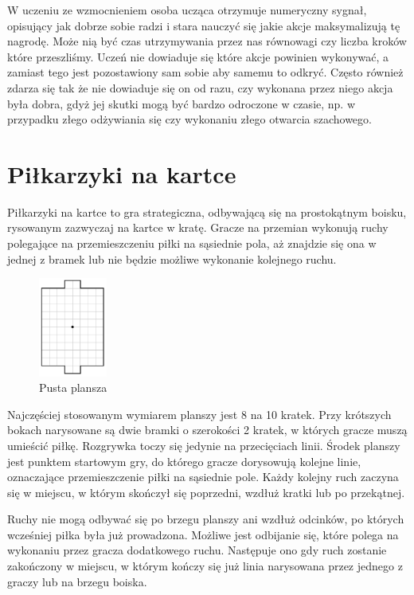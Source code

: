 \documentclass[licencjacka]{pracamgr}
\begin{document}
W uczeniu ze wzmocnieniem osoba ucząca otrzymuje numeryczny sygnał, opisujący jak dobrze sobie radzi i stara nauczyć się jakie akcje maksymalizują tę nagrodę. Może nią być czas utrzymywania przez nas równowagi czy liczba kroków które przeszliśmy. Uczeń nie dowiaduje się które akcje powinien wykonywać, a zamiast tego jest pozostawiony sam sobie aby samemu to odkryć. Często również zdarza się tak że nie dowiaduje się on od razu, czy wykonana przez niego akcja była dobra, gdyż jej skutki mogą być bardzo odroczone w czasie, np. w przypadku złego odżywiania się czy wykonaniu złego otwarcia szachowego.

\section{Piłkarzyki na kartce}

Piłkarzyki na kartce to gra strategiczna, odbywającą się na prostokątnym boisku, rysowanym zazwyczaj na kartce w kratę.
Gracze na przemian wykonują ruchy polegające na przemieszczeniu piłki na sąsiednie pola, aż znajdzie się ona w jednej z bramek lub nie będzie możliwe wykonanie kolejnego ruchu.

\begin{figure}[ht]
  \centering
  \includegraphics[width=0.2\textwidth]{board}
  \caption{Pusta plansza}
\end{figure}

Najczęściej stosowanym wymiarem planszy jest 8 na 10 kratek.
Przy krótszych bokach narysowane są dwie bramki o szerokości 2 kratek, w których gracze muszą umieścić piłkę.
Rozgrywka toczy się jedynie na przecięciach linii.
Środek planszy jest punktem startowym gry, do którego gracze dorysowują kolejne linie, oznaczające przemieszczenie piłki na sąsiednie pole. Każdy kolejny ruch zaczyna się w miejscu, w którym skończył się poprzedni, wzdłuż kratki lub po przekątnej. 

Ruchy nie mogą odbywać się po brzegu planszy ani wzdłuż odcinków, po których wcześniej piłka była już prowadzona.
Możliwe jest odbijanie się, które polega na wykonaniu przez gracza dodatkowego ruchu. Następuje ono gdy ruch zostanie zakończony w miejscu, w którym kończy się już linia narysowana przez jednego z graczy lub na brzegu boiska. 
\end{document}
